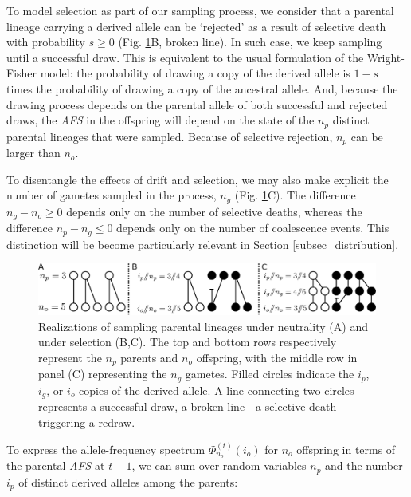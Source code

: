 \documentclass[review]{elsarticle}
\newcommand{\afs}[2]{\Phi_{#1}^{(#2)}}
\begin{document}
To model selection as part of our sampling process, we consider that a parental lineage carrying a
derived allele can be `rejected' as a result of selective death with probability $s\ge0$ (Fig.
\ref{fig_schematic}B, broken line). In such case, we keep sampling until a successful draw. This is
equivalent to the usual formulation of the Wright-Fisher model: the probability of drawing a copy of the
derived allele is $1-s$ times the probability of drawing a copy of the ancestral allele. And, because the drawing
process depends on the parental allele of both successful and rejected draws, the \textit{AFS} in the
offspring will depend on the state of the $n_p$ distinct parental lineages that were sampled. 
Because of selective rejection, $n_p$ can be larger than
$n_o$. %

To disentangle the effects of drift and selection, we may also make explicit the number of gametes
sampled in the process, $n_g$ (Fig. \ref{fig_schematic}C). The difference $n_g-n_o  \ge 0$
depends only on the number of selective deaths, whereas the difference $n_p-n_g \le 0$ depends
only on the number of coalescence events. This distinction will be become particularly relevant in Section
\ref{subsec_distribution}. %

\begin{figure}[h]
  \centering
  \includegraphics[width=1.0\textwidth]{fig/schematic.pdf}
  \caption{\label{fig_schematic} Realizations of sampling parental lineages under neutrality (A) and
    under selection (B,C). The top and bottom rows respectively represent the $n_p$ parents and
    $n_o$ offspring, with the middle row in panel (C) representing the $n_g$ gametes. Filled circles
    indicate the $i_p$, $i_g$, or $i_o$ copies of the derived allele. A line connecting two circles
    represents a successful draw, a broken line - a selective death triggering a redraw. }
\end{figure}

To express the allele-frequency spectrum $\afs{n_o}{t}(i_o)$ for $n_o$ offspring in terms of the parental
\textit{AFS} at $t-1$, we can sum over random variables $n_p$ and the number $i_p$ of distinct derived alleles
among the parents:
\end{document}
